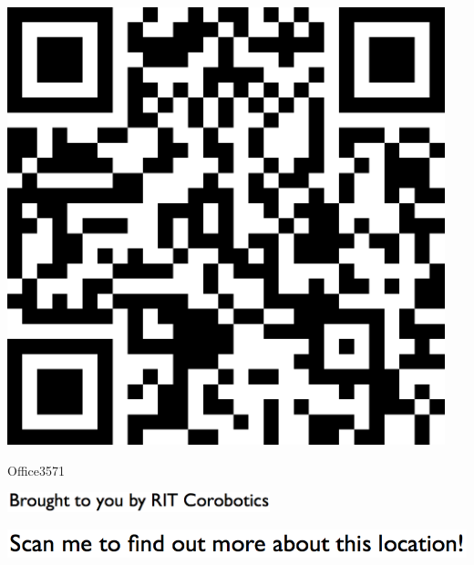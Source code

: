 \documentclass[letterpaper]{article}
\begin{document}
 \begingroup 
 \centerline{\includegraphics[scale=1,width=5in,height=5in]{Office3571.png}} 
 \endgroup 
 \vspace*{\fill} 

 \hfill{\small Office3571} 

  \vspace{0.7in} 
 
 \centerline{\includegraphics[scale=1,width=3in]{text-bottom.png}} 
 
 \pagebreak 
{} 
 \vspace*{\fill} 
 
  \centerline{\includegraphics[scale=1,width=6in]{text-top.png}} 
 
 \vspace{0.5in} 
 
\end{document}
